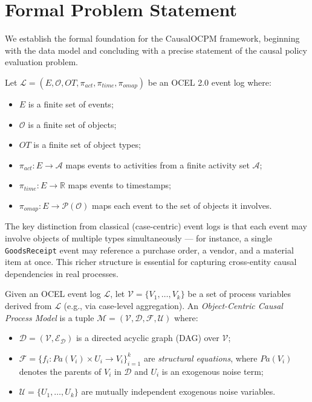 \section{Formal Problem Statement}
\label{sec:problem}

We establish the formal foundation for the CausalOCPM framework, beginning
with the data model and concluding with a precise statement of the causal
policy evaluation problem.

\begin{definition}
\label{def:ocel}
Let $\mathcal{L} = (E, \mathcal{O}, \mathit{OT}, \pi_{\mathit{act}},
\pi_{\mathit{time}}, \pi_{\mathit{omap}})$ be an OCEL 2.0 event log where:
\begin{itemize}
    \item $E$ is a finite set of events;
    \item $\mathcal{O}$ is a finite set of objects;
    \item $\mathit{OT}$ is a finite set of object types;
    \item $\pi_{\mathit{act}}: E \to \mathcal{A}$ maps events to activities
          from a finite activity set $\mathcal{A}$;
    \item $\pi_{\mathit{time}}: E \to \mathbb{R}$ maps events to timestamps;
    \item $\pi_{\mathit{omap}}: E \to \mathcal{P}(\mathcal{O})$ maps each
          event to the set of objects it involves.
\end{itemize}
\end{definition}

\noindent The key distinction from classical (case-centric) event logs is that
each event may involve objects of multiple types simultaneously --- for instance,
a single \texttt{GoodsReceipt} event may reference a purchase order, a vendor,
and a material item at once. This richer structure is essential for capturing
cross-entity causal dependencies in real processes.

\begin{definition}
\label{def:ocpm}
Given an OCEL event log $\mathcal{L}$, let
$\mathcal{V} = \{V_1, \ldots, V_k\}$ be a set of process variables derived
from $\mathcal{L}$ (e.g., via case-level aggregation).
An \emph{Object-Centric Causal Process Model} is a tuple
$\mathcal{M} = (\mathcal{V}, \mathcal{D}, \mathcal{F}, \mathcal{U})$ where:
\begin{itemize}
    \item $\mathcal{D} = (\mathcal{V}, \mathcal{E_D})$ is a directed acyclic
          graph (DAG) over $\mathcal{V}$;
    \item $\mathcal{F} = \{f_i : \mathit{Pa}(V_i) \times U_i \to V_i\}_{i=1}^{k}$
          are \emph{structural equations}, where $\mathit{Pa}(V_i)$ denotes
          the parents of $V_i$ in $\mathcal{D}$ and $U_i$ is an exogenous
          noise term;
    \item $\mathcal{U} = \{U_1, \ldots, U_k\}$ are mutually independent
          exogenous noise variables.
\end{itemize}
\end{definition}

